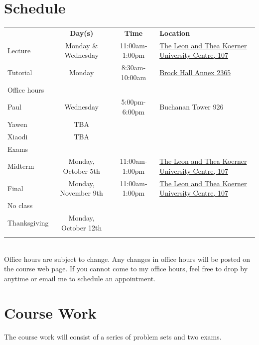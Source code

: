 \documentclass[10pt]{article}
\begin{document}
\section{Schedule}
\begin{tabular}{l c c l}
  \hline 
  & \textbf{Day(s)} & \textbf{Time} & \textbf{Location} \\
  Lecture & Monday \& Wednesday & 11:00am-1:00pm & \href{https://ssc.adm.ubc.ca/classroomservices/function/viewlocation?userEvent=ShowLocation&buildingID=UCLL&roomID=107}
{The Leon and Thea Koerner University Centre, 107} \\
  Tutorial & Monday & 8:30am-10:00am &
  \href{https://ssc.adm.ubc.ca/classroomservices/function/viewlocation?userEvent=ShowLocation&buildingID=BRKX&roomID=2365}
  {Brock Hall Annex 2365}  \\
  Office hours \\
  \; Paul & Wednesday & 5:00pm-6:00pm & Buchanan Tower 926 \\
  \; Yawen & TBA & & \\ 
  \; Xiaodi & TBA & & \\ \hline
  Exams \\
  \; Midterm & Monday, October 5th & 11:00am-1:00pm & \href{https://ssc.adm.ubc.ca/classroomservices/function/viewlocation?userEvent=ShowLocation&buildingID=UCLL&roomID=107}
{The Leon and Thea Koerner University Centre, 107} \\
  \; Final & Monday, November 9th & 11:00am-1:00pm & \href{https://ssc.adm.ubc.ca/classroomservices/function/viewlocation?userEvent=ShowLocation&buildingID=UCLL&roomID=107}
{The Leon and Thea Koerner University Centre, 107} \\
  No class \\
  \; Thanksgiving & Monday, October 12th \\
  \\ \hline 
\end{tabular} \\
Office hours are subject to change. Any changes in office hours will
be posted on the course web page. If you cannot come to my office
hours, feel free to drop by anytime or email me to schedule an
appointment.  

\section{Course Work}

The course work will consist of a series of problem sets and two
exams. 
\end{document}
